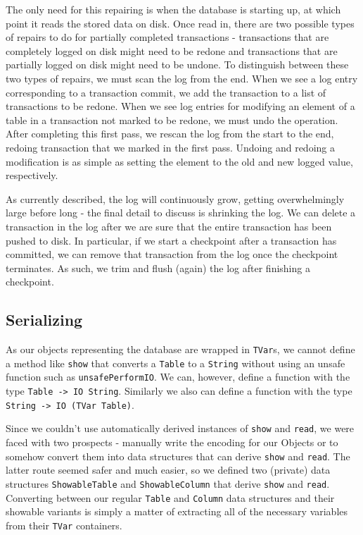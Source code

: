 \documentclass[10pt]{article}
\begin{document}
\begin{multicols}{2}
The only need for this repairing is when the database is starting up, at which point it reads the stored data on disk. Once read in, there are two possible types of repairs to do for partially completed transactions - transactions that are completely logged on disk might need to be redone and transactions that are partially logged on disk might need to be undone. To distinguish between these two types of repairs, we must scan the log from the end. When we see a log entry corresponding to a transaction commit, we add the transaction to a list of transactions to be redone. When we see log entries for modifying an element of a table in a transaction not marked to be redone, we must undo the operation. After completing this first pass, we rescan the log from the start to the end, redoing transaction that we marked in the first pass. Undoing and redoing a modification is as simple as setting the element to the old and new logged value, respectively.

As currently described, the log will continuously grow, getting overwhelmingly large before long - the final detail to discuss is shrinking the log. We can delete a transaction in the log after we are sure that the entire transaction has been pushed to disk. In particular, if we start a checkpoint after a transaction has committed, we can remove that transaction from the log once the checkpoint terminates. As such, we trim and flush (again) the log after finishing a checkpoint.


\subsection{Serializing}
As our objects representing the database are wrapped in \texttt{TVar}s, we cannot define a method like \texttt{show} that converts a \texttt{Table} to a \texttt{String} without using an unsafe function such as \texttt{unsafePerformIO}. We can, however, define a function with the type \texttt{Table -> IO String}. Similarly we also can define a function with the type \texttt{String -> IO (TVar Table)}.

Since we couldn't use automatically derived instances of \texttt{show} and \texttt{read}, we were faced with two prospects - manually write the encoding for our Objects or to somehow convert them into data structures that can derive \texttt{show} and \texttt{read}. The latter route seemed safer and much easier, so we defined two (private) data structures \texttt{ShowableTable} and \texttt{ShowableColumn} that derive \texttt{show} and \texttt{read}. Converting between our regular \texttt{Table} and \texttt{Column} data structures and their showable variants is simply a matter of extracting all of the necessary variables from their \texttt{TVar} containers.


\end{multicols}
\end{document}
